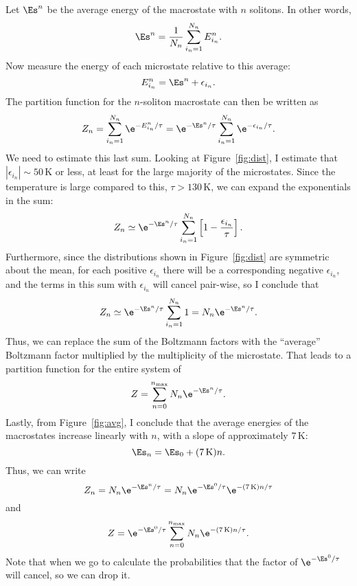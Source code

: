 \documentclass[11pt]{article}
\begin{document}


Let $\Es^n$ be the average energy of the macrostate with $n$ solitons. In other words,
\begin{equation}
\Es^n=\frac{1}{N_n}\sum_{i_n=1}^{N_n} E_{i_n}^n.
\end{equation}
Now measure the energy of each microstate relative to this average:
\begin{equation}
E_{i_n}^n=\Es^n+\epsilon_{i_n}.
\end{equation}
The partition function for the $n$-soliton macrostate can then be written as
\begin{equation}
Z_n=\sum_{i_n=1}^{N_n}\e^{-E_{i_n}^n/\tau}
	=\e^{-\Es^n/\tau}\sum_{i_n=1}^{N_n}\e^{-\epsilon_{i_n}/\tau}.
\end{equation}
We need to estimate this last sum. Looking at Figure~\ref{fig:dist}, I estimate that $|\epsilon_{i_n}|\sim 50\,\text{K}$ or less, at least for the large majority of the microstates. Since the temperature is large compared to this, $\tau>130\,\text{K}$, we can expand the exponentials in the sum:
\begin{equation}
Z_n\simeq\e^{-\Es^n/\tau}\sum_{i_n=1}^{N_n}
	\left[1-\frac{\epsilon_{i_n}}{\tau}\right].
\end{equation}
Furthermore, since the distributions shown in Figure~\ref{fig:dist} are symmetric about the mean, for each positive $\epsilon_{i_n}$ there will be a corresponding negative $\epsilon_{i_n}$, and the terms in this sum with $\epsilon_{i_n}$ will cancel pair-wise, so I conclude that
\begin{equation}
Z_n\simeq\e^{-\Es^n/\tau}\sum_{i_n=1}^{N_n} 1=N_n\e^{-\Es^n/\tau}.
\end{equation}
Thus, we can replace the sum of the Boltzmann factors with the ``average'' Boltzmann factor multiplied by the multiplicity of the microstate. That leads to a partition function for the entire system of
\begin{equation}
Z=\sum_{n=0}^{n_\text{max}} N_n\e^{-\Es^n/\tau}.
\end{equation}
Lastly, from Figure~\ref{fig:avg}, I conclude that the average energies of the macrostates increase linearly with $n$, with a slope of approximately $7\,\text{K}$:
\begin{equation}
\Es_n=\Es_0+(7\,\text{K})n.
\end{equation}
Thus, we can write
\begin{equation}
Z_n=N_n\e^{-\Es^n/\tau}=N_n\e^{-\Es^0/\tau}\e^{-(7\,\text{K})n/\tau}
\end{equation}
and
\begin{equation}
Z=\e^{-\Es^0/\tau}\sum_{n=0}^{n_\text{max}}N_n\e^{-(7\,\text{K})n/\tau}.
\end{equation}
Note that when we go to calculate the probabilities that the factor of $\e^{-\Es^0/\tau}$ will cancel, so we can drop it.
\end{document}
